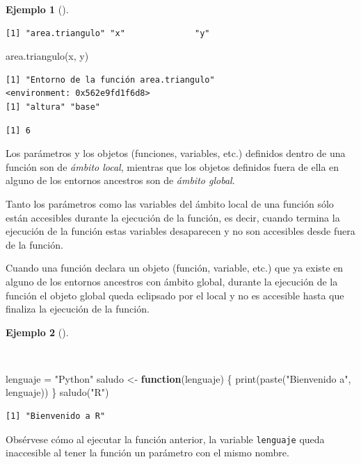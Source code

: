 \documentclass[
  a4paper,
]{scrreport}
\newenvironment{Shaded}{\begin{snugshade}}{\end{snugshade}}
\newcommand{\ControlFlowTok}[1]{\textcolor[rgb]{0.00,0.23,0.31}{\textbf{#1}}}
\newcommand{\FunctionTok}[1]{\textcolor[rgb]{0.28,0.35,0.67}{#1}}
\newcommand{\NormalTok}[1]{\textcolor[rgb]{0.00,0.23,0.31}{#1}}
\newcommand{\OtherTok}[1]{\textcolor[rgb]{0.00,0.23,0.31}{#1}}
\newcommand{\StringTok}[1]{\textcolor[rgb]{0.13,0.47,0.30}{#1}}
\theoremstyle{definition}
\theoremstyle{definition}
\newtheorem{example}{Ejemplo}[chapter]
\theoremstyle{remark}
\begin{document}
\begin{example}[]
\begin{verbatim}
[1] "area.triangulo" "x"              "y"             
\end{verbatim}

\begin{Shaded}
\begin{Highlighting}[]
\FunctionTok{area.triangulo}\NormalTok{(x, y)}
\end{Highlighting}
\end{Shaded}

\begin{verbatim}
[1] "Entorno de la función area.triangulo"
<environment: 0x562e9fd1f6d8>
[1] "altura" "base"  
\end{verbatim}

\begin{verbatim}
[1] 6
\end{verbatim}

\end{example}

Los parámetros y los objetos (funciones, variables, etc.) definidos
dentro de una función son de \emph{ámbito local}, mientras que los
objetos definidos fuera de ella en alguno de los entornos ancestros son
de \emph{ámbito global}.

Tanto los parámetros como las variables del ámbito local de una función
sólo están accesibles durante la ejecución de la función, es decir,
cuando termina la ejecución de la función estas variables desaparecen y
no son accesibles desde fuera de la función.

Cuando una función declara un objeto (función, variable, etc.) que ya
existe en alguno de los entornos ancestros con ámbito global, durante la
ejecución de la función el objeto global queda eclipsado por el local y
no es accesible hasta que finaliza la ejecución de la función.

\begin{example}[]\protect\hypertarget{exm-eclise-variables-globales-por-locales}{}\label{exm-eclise-variables-globales-por-locales}

~

\begin{Shaded}
\begin{Highlighting}[]
\NormalTok{lenguaje }\OtherTok{=} \StringTok{"Python"}
\NormalTok{saludo }\OtherTok{\textless{}{-}} \ControlFlowTok{function}\NormalTok{(lenguaje) \{}
  \FunctionTok{print}\NormalTok{(}\FunctionTok{paste}\NormalTok{(}\StringTok{"Bienvenido a"}\NormalTok{, lenguaje))  }
\NormalTok{\}}
\FunctionTok{saludo}\NormalTok{(}\StringTok{"R"}\NormalTok{)}
\end{Highlighting}
\end{Shaded}

\begin{verbatim}
[1] "Bienvenido a R"
\end{verbatim}

Obsérvese cómo al ejecutar la función anterior, la variable
\texttt{lenguaje} queda inaccesible al tener la función un parámetro con
el mismo nombre.

\end{example}
\end{document}
